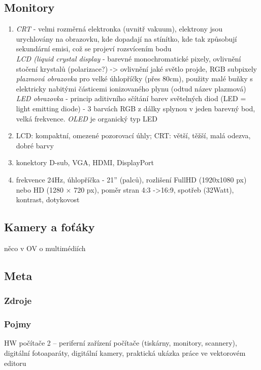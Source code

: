 \documentclass[12pt]{article}
\begin{document}
\subsection{Monitory}
\begin{enumerate}
\item \emph{CRT} - velmi rozměrná elektronka (uvnitř vakuum), elektrony jsou urychlovány na obrazovku, kde dopadají na stínítko, kde tak způsobují sekundární emisi, což se projeví rozsvícením bodu\\
\emph{LCD (liquid crystal display} - barevné monochromatické pixely, ovlivnění stočení krystalů (polarizace?) -> ovlivnění jaké světlo projde, RGB subpixely\\
\emph{plazmová obrazovka} pro velké úhlopříčky (přes 80cm), použity malé buňky s elektricky nabitými částicemi ionizovaného plynu (odtud název plazmová)\\
\emph{LED obrazovka} - princip aditivního sčítání barev světelných diod (LED = light emitting diode) - 3 barvách RGB z dálky splynou v jeden barevný bod, velká frekvence. \emph{OLED} je organický typ LED
\item LCD: kompaktní, omezené pozorovací úhly;
CRT: větší, těžší, malá odezva, dobré barvy
\item konektory D-sub, VGA, HDMI, DisplayPort
\item frekvence 24Hz, úhlopříčka - 21'' (palců), rozlišení FullHD (1920x1080 px) nebo HD (1280 $\times$ 720 px), poměr stran 4:3 ->16:9, spotřeb (32Watt), kontrast, dotykovost
\end{enumerate}
\subsection{Kamery a foťáky}
něco v OV o multimédiích
\subsection{Meta}
\subsubsection{Zdroje}
\subsubsection{Pojmy}
HW počítače 2 – periferní zařízení počítače (tiskárny, monitory, scannery), digitální fotoaparáty, digitální kamery, praktická ukázka práce ve vektorovém editoru
\end{document}
